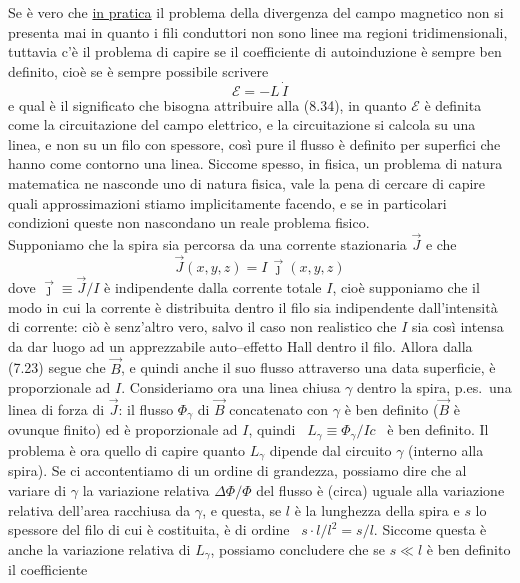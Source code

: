 Se \`e vero che \underline{in pratica} il problema della divergenza del campo
magnetico non si presenta mai in quanto i fili conduttori non sono linee ma
regioni tridimensionali, tuttavia c'\`e il problema di capire se il coefficiente
di autoinduzione \`e sempre ben definito, cio\`e se \`e sempre possibile
scrivere
\begin{equation}
  \mathcal E=-L\,\dot I
  \tag{8.34}
\end{equation}
e qual \`e il significato che bisogna attribuire alla (8.34), in quanto
$\mathcal E$ \`e definita come la circuitazione del campo elettrico, e la
circuitazione si calcola su una linea, e non su un filo con spessore, cos\`i
pure il flusso \`e definito per superfici che hanno come contorno una linea.
Siccome spesso, in fisica, un problema di natura matematica ne nasconde uno di
natura fisica, vale la pena di cercare di capire quali approssimazioni stiamo
implicitamente facendo, e se in particolari condizioni queste non nascondano un
reale problema fisico.\\
Supponiamo che la spira sia percorsa da una corrente stazionaria $\vec J$ e che
\begin{equation}
  \vec J(x,y,z)=I\,\vec\jmath(x,y,z)
  \tag{8.35}
\end{equation}
dove $\vec\jmath\equiv\vec J/I$ \`e indipendente dalla corrente totale $I$,
cio\`e supponiamo che il modo in cui la corrente \`e distribuita dentro il filo
sia indipendente dall'intensit\`a di corrente: ci\`o \`e senz'altro vero, salvo
il caso non realistico che $I$ sia cos\`i intensa da dar luogo ad un
apprezzabile auto--effetto Hall dentro il filo. Allora dalla (7.23) segue che
$\vec B$, e quindi anche il suo flusso attraverso una data superficie, \`e
proporzionale ad $I$. Consideriamo ora una linea chiusa $\gamma$ dentro la
spira, p.es.\ una linea di forza di $\vec J$: il flusso $\Phi_\gamma$ di
$\vec B$ concatenato con $\gamma$ \`e ben definito ($\vec B$ \`e ovunque finito)
ed \`e proporzionale ad $I$, quindi \ $L_\gamma\equiv\Phi_\gamma/Ic$ \ \`e ben
definito. Il problema \`e ora quello di capire quanto $L_\gamma$ dipende dal
circuito $\gamma$ (interno alla spira). Se ci accontentiamo di un ordine di
grandezza, possiamo dire che al variare di $\gamma$ la variazione relativa
$\Delta\Phi/\Phi$ del flusso \`e (circa) uguale alla variazione relativa
dell'area racchiusa da $\gamma$, e questa, se $l$ \`e la lunghezza della spira e
$s$ lo spessore del filo di cui \`e costituita, \`e di ordine
\ $s\cdot l/l^2=s/l$. Siccome questa \`e anche la variazione relativa di
$L_\gamma$, possiamo concludere che se $s\ll l$ \`e ben definito il coefficiente
